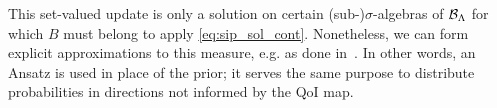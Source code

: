 This set-valued update is only a solution on certain (sub-)$\sigma$-algebras of $\mathcal{B}_{{\Lambda}}$ for which $B$ must belong to apply \eqref{eq:sip_sol_cont}.
Nonetheless, we can form explicit approximations to this measure, e.g. as done in~\cite{BET+14, BES12, BBE11}.
In other words, an Ansatz is used in place of the prior; it serves the same purpose to distribute probabilities in directions not informed by the QoI map.


